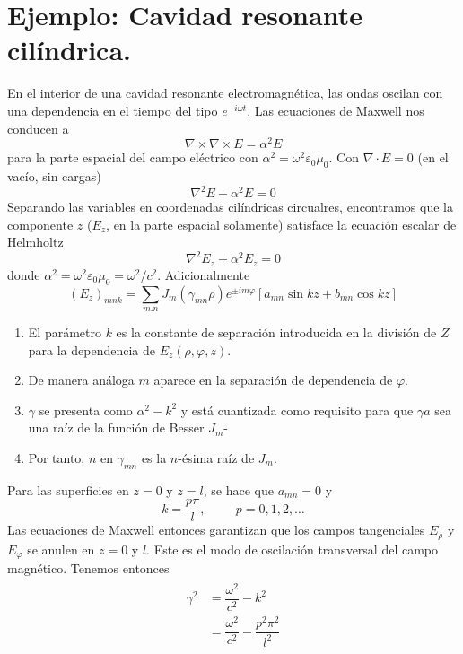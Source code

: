 \section{Ejemplo: Cavidad resonante cilíndrica.}
En el interior de una cavidad resonante electromagnética, las ondas oscilan con una dependencia en el tiempo del tipo $e^{-i \omega t}$. Las ecuaciones de Maxwell nos conducen a
\[ \nabla \times \nabla \times E = \alpha^{2} E \]
para la parte espacial del campo eléctrico con $\alpha^{2} = \omega^{2} \varepsilon_{0} \mu_{0}$. Con $\nabla \cdot E=0$ (en el vacío, sin cargas)
\[ \nabla^{2} E + \alpha^{2} E = 0 \]
Separando las variables en coordenadas cilíndricas circualres, encontramos que la componente $z$ ($E_{z}$, en la parte espacial solamente) satisface la ecuación escalar de Helmholtz
\begin{equation}
\nabla^{2} E_{z} + \alpha^{2} E_{z} = 0
\label{eq:ecuacion_11_39}
\end{equation}
donde $\alpha^{2} =  \omega^{2} \varepsilon_{0} \mu_{0} = \omega^{2}/c^{2}$. Adicionalmente
\begin{equation}
(E_{z})_{mnk} = \sum_{m.n} J_{m} (\gamma_{mn} \rho) e^{\pm im\varphi} [ a_{mn} \sin kz + b_{mn} \cos kz ]
\label{eq:ecuacion_11_40}
\end{equation}
\begin{enumerate}
\item El parámetro $k$ es la constante de separación introducida en la división de $Z$ para la dependencia de $E_{z}(\rho, \varphi,z)$.
\item De manera análoga $m$ aparece en la separación de dependencia de $\varphi$.
\item $\gamma$ se presenta como $\alpha^{2} - k^{2}$ y está cuantizada como requisito para que $\gamma a$ sea una raíz de la función de Besser $J_{m}$-
\item Por tanto, $n$ en $\gamma_{mn}$ es la $n$-ésima raíz de $J_{m}$.
\end{enumerate}
Para las superficies en $z=0$ y $z=l$, se hace que $a_{mn}=0$ y
\begin{equation}
k = \dfrac{p \pi}{l}, \hspace{1cm} p=0,1,2,\ldots
\label{eq:ecuacion_11_41}
\end{equation}
Las ecuaciones de Maxwell entonces garantizan que los campos tangenciales $E_{\rho}$ y $E_{\varphi}$ se anulen en $z=0$ y $l$. Este es el modo de oscilación transversal del campo magnético. Tenemos entonces
\begin{eqnarray}
\begin{aligned}
\gamma^{2} &= \dfrac{\omega^{2}}{c^{2}} - k^{2} \\
&= \dfrac{\omega^{2}}{c^{2}} - \dfrac{p^{2} \pi^{2}}{l^{2}}
\end{aligned}
\label{eq:ecuacion_11_42}
\end{eqnarray}
